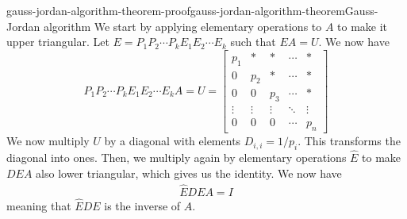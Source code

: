 \documentclass[preview]{standalone}
\begin{document}
\begin{snippetproof}{gauss-jordan-algorithm-theorem-proof}{gauss-jordan-algorithm-theorem}{Gauss-Jordan algorithm}
    We start by applying elementary operations to \(A\) to make it upper triangular.
    Let \(E = P_1P_2\cdots P_k E_1 E_2 \cdots E_k\) such that \(EA=U\). We now have
    \[
        P_1P_2\cdots P_k E_1 E_2 \cdots E_k A = U = \begin{bmatrix}
            p_1 & *   & *   & \cdots & * \\
            0   & p_2 & *   & \cdots & * \\
            0   & 0   & p_3 & \cdots & * \\
            \vdots & \vdots & \vdots & \ddots & \vdots \\
            0   & 0   & 0   & \cdots & p_n
        \end{bmatrix}
    \]
    We now multiply \(U\) by a diagonal \matrix with elements \(D_{i,i} = 1/p_i\).
    This transforms the diagonal into ones.
    Then, we multiply again by elementary operations \(\hat{E}\) to make \(DEA\) also
    lower triangular, which gives us the identity. We now have
    \begin{align*}
        \hat{E}DEA = I
    \end{align*}
    meaning that \(\hat{E}DE\) is the inverse of \(A\).
\end{snippetproof}
\end{document}
